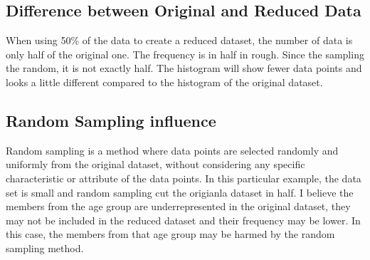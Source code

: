 \documentclass[
	letterpaper, %
]{jdf}
\begin{document}
\subsection{Difference between Original and Reduced Data}
When using 50\% of the data to create a reduced dataset, the number of data is only half of the original one. The frequency is in half in rough. Since the sampling the random, it is not exactly half. The histogram will show fewer data points and looks a little different compared to the histogram of the original dataset.
\subsection{Random Sampling influence}
Random sampling is a method where data points are selected randomly and uniformly from the original dataset, without considering any specific characteristic or attribute of the data points.
In this particular example, the data set is small and random sampling cut the origianla dataset in half. I believe the members from the age group are underrepresented in the original dataset, they may not be included in the reduced dataset and their frequency may be lower. In this case, the members from that age group may be harmed by the random sampling method.
\end{document}

